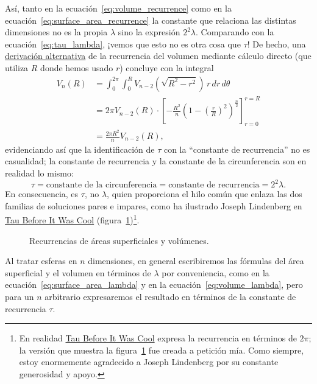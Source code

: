Así, tanto en la ecuación~\eqref{eq:volume_recurrence} como en la ecuación~\eqref{eq:surface_area_recurrence} la constante que relaciona las distintas dimensiones no es la propia $\lambda$ sino la expresión $2^2\lambda$. Comparando con la ecuación~\eqref{eq:tau_lambda}, ¡vemos que esto no es otra cosa que $\tau$! De hecho, una \href{https://en.wikipedia.org/wiki/Volume_of_an_n-ball#The_two-dimension_recursion_formula}{derivación alternativa} de la recurrencia del volumen mediante cálculo directo (que utiliza $R$ donde hemos usado $r$) concluye con la integral
\begin{align}
\label{eq:integral_recurrence}
V_n(R) &= \int_0^{2\pi} \int_0^R V_{n-2}\left(\sqrt{R^2 - r^2}\right) \,r\,dr\,d\theta \nonumber \\
&= 2\pi V_{n-2}(R) \cdot \left[-\frac{R^2}{n}\left(1 - \left(\frac{r}{R}\right)^2\right)^\frac{n}{2}\right]_{r=0}^{r=R} \\
&= \frac{2\pi R^2}{n} V_{n-2}(R), \nonumber
\end{align}
evidenciando así que la identificación de  $\tau$ con la ``constante de recurrencia'' no es casualidad; la constante de recurrencia y la constante de la circunferencia son en realidad lo mismo:
\[
\tau = \mbox{constante de la circunferencia} = \mbox{constante de recurrencia} = 2^2\lambda.
\]
En consecuencia, es $\tau$, no $\lambda$, quien proporciona el hilo común que enlaza las dos familias de soluciones pares e impares, como ha ilustrado Joseph Lindenberg en \href{http://sites.google.com/site/taubeforeitwascool/}{Tau Before It Was Cool} (figura~\ref{fig:Nspheres})\footnote{En realidad \href{http://sites.google.com/site/taubeforeitwascool/}{Tau Before It Was Cool} expresa la recurrencia en términos de $2\pi$; la versión que muestra la figura~\ref{fig:Nspheres} fue creada a petición mía. Como siempre, estoy enormemente agradecido a Joseph Lindenberg por su constante generosidad y apoyo.}.

\begin{figure}
\begin{center}
\end{center}
\caption{Recurrencias de áreas superficiales y volúmenes.\label{fig:Nspheres}}
\end{figure}


Al tratar esferas en $n$ dimensiones, en general escribiremos las fórmulas del área superficial y el volumen en términos de $\lambda$ por conveniencia, como en la ecuación~\eqref{eq:surface_area_lambda} y en la ecuación~\eqref{eq:volume_lambda}, pero para un $n$ arbitrario expresaremos el resultado en términos de la constante de recurrencia $\tau$.

